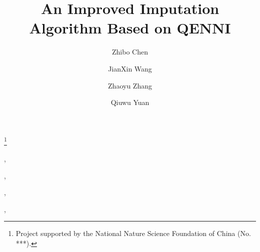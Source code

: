 \documentclass[print]{jicspack}
\begin{document}
\begin{premaker}


\title{An Improved Imputation Algorithm Based on QENNI }
\thanks[label1]{Project supported by the National Nature Science Foundation of China (No. ***).}
\author[author1]{Zhibo Chen},
\author[author2]{JianXin Wang},
\author[author3]{Zhaoyu Zhang},
\author[author4]{Qiuwu Yuan},

\address[author1]{School of Information Science And Technology, Beijing Forestry University, Beijing 100083, China}
\address[author2]{School of Information Science And Technology, Beijing Forestry University, Beijing 100083, China}
\address[author3]{School of Information Science And Technology, Beijing Forestry University, Beijing 100083, China}
\address[author4]{School of Information Science And Technology, Beijing Forestry University, Beijing 100083, China}


\end{premaker}
\end{document}
